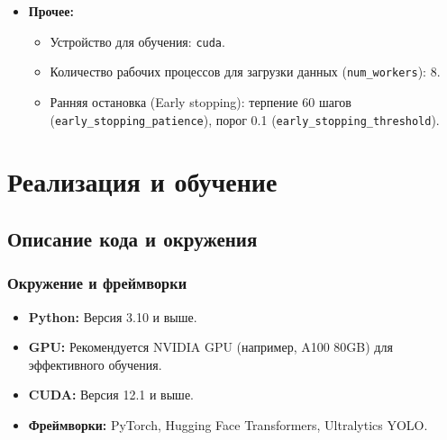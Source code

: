 \documentclass[12pt, a4paper]{article}
\theoremstyle{definition}
\theoremstyle{remark}
\begin{document}
\begin{itemize}
\begin{itemize}
			\item Диапазон контрастности: [0.8, 1.2] (\texttt{contrast\_min}, \texttt{contrast\_max}).
			\item Диапазон размытия (blur kernel size): [0, 2] (\texttt{blur\_min}, \texttt{blur\_max}).
			\item Уровень шума: 0.05 (\texttt{noise\_level}).
			\item Диапазон резкости: [0.8, 1.5] (\texttt{sharpness\_min}, \texttt{sharpness\_max}).
		\end{itemize}
		\item \textbf{Прочее:}
		\begin{itemize}
			\item Устройство для обучения: \texttt{cuda}.
			\item Количество рабочих процессов для загрузки данных (\texttt{num\_workers}): 8.
			\item Ранняя остановка (Early stopping): терпение 60 шагов (\texttt{early\_stopping\_patience}), порог 0.1 (\texttt{early\_stopping\_threshold}).
		\end{itemize}
	\end{itemize}
	
	\section{Реализация и обучение}
	\subsection{Описание кода и окружения}
	\subsubsection{Окружение и фреймворки}
	\begin{itemize}
		\item \textbf{Python:} Версия 3.10 и выше.
		\item \textbf{GPU:} Рекомендуется NVIDIA GPU (например, A100 80GB) для эффективного обучения.
		\item \textbf{CUDA:} Версия 12.1 и выше.
		\item \textbf{Фреймворки:} PyTorch, Hugging Face Transformers, Ultralytics YOLO.
	\end{itemize}
	
\end{document}

